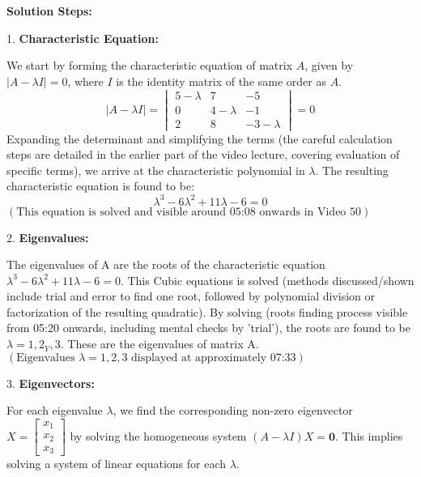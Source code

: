 \documentclass{article}
\begin{document}
\textbf{Solution Steps:}

1.  \textbf{Characteristic Equation:}

    We start by forming the characteristic equation of matrix $A$, given by $|A - \lambda I| = 0$, where $I$ is the identity matrix of the same order as $A$.
    \[ |A - \lambda I| = \begin{vmatrix} 5-\lambda & 7 & -5 \\ 0 & 4-\lambda & -1 \\ 2 & 8 & -3-\lambda \end{vmatrix} = 0 \]
    Expanding the determinant and simplifying the terms (the careful calculation steps are detailed in the earlier part of the video lecture, covering evaluation of specific terms), we arrive at the characteristic polynomial in $\lambda$.
    The resulting characteristic equation is found to be:
    \[ \lambda^3 - 6\lambda^2 + 11\lambda - 6 = 0 \]
    $( \text{This equation is solved and visible around 05:08 onwards in Video 50} )$

2.  \textbf{Eigenvalues:}

    The eigenvalues of A are the roots of the characteristic equation $\lambda^3 - 6\lambda^2 + 11\lambda - 6 = 0$. This Cubic equations is solved (methods discussed/shown include trial and error to find one root, followed by polynomial division or factorization of the resulting quadratic).
    By solving (roots finding process visible from 05:20 onwards, including mental checks by 'trial'), the roots are found to be $\lambda = 1, 2_Y, 3$. These are the eigenvalues of matrix A.
    $( \text{Eigenvalues } \lambda=1, 2, 3 \text{ displayed at approximately 07:33} )$

3.  \textbf{Eigenvectors:}

    For each eigenvalue $\lambda$, we find the corresponding non-zero eigenvector $X = \begin{bmatrix} x_1 \\ x_2 \\ x_3 \end{bmatrix}$ by solving the homogeneous system $(A - \lambda I)X = \mathbf{0}$. This implies solving a system of linear equations for each $\lambda$.
\end{document}
